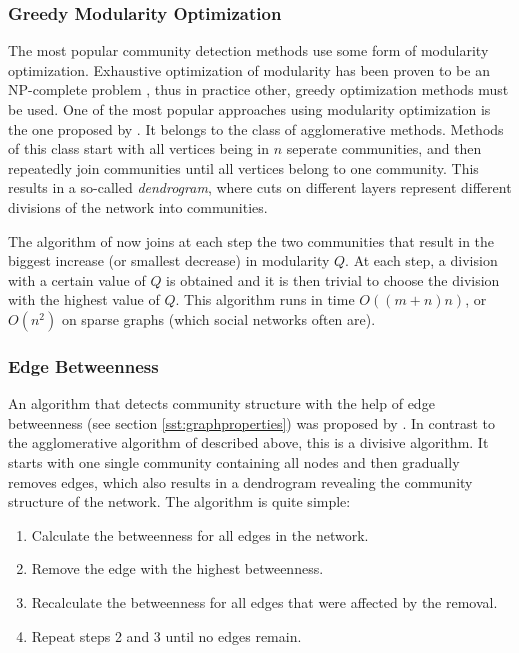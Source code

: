 \subsubsection{Greedy Modularity Optimization}
\label{ssst:modularityoptimization} The most popular community detection methods use some form of modularity optimization. Exhaustive optimization of modularity has been proven to be an NP-complete problem \cite{Brandes_2006}, thus in practice other, greedy optimization methods must be used. One of the most popular approaches using modularity optimization is the one proposed by \cite{Clauset_2004}. It belongs to the class of agglomerative methods. Methods of this class start with all vertices being in $n$ seperate communities, and then repeatedly join communities until all vertices belong to one community. This results in a so-called \textit{dendrogram}, where cuts on different layers represent different divisions of the network into communities.

The algorithm of \cite{Clauset_2004} now joins at each step the two communities that result in the biggest increase (or smallest decrease) in modularity $Q$. At each step, a division with a certain value of $Q$ is obtained and it is then trivial to choose the division with the highest value of $Q$. This algorithm runs in time $O((m+n)n)$, or $O(n^2)$ on sparse graphs (which social networks often are).

\subsubsection{Edge Betweenness}
\label{ssst:edgebetweenness} An algorithm that detects community structure with the help of edge betweenness (see section \ref{sst:graphproperties}) was proposed by \cite{Girvan_2002}. In contrast to the agglomerative algorithm of \cite{Clauset_2004} described above, this is a divisive algorithm. It starts with one single community containing all nodes and then gradually removes edges, which also results in a dendrogram revealing the community structure of the network. The algorithm is quite simple:

\begin{enumerate}
\item Calculate the betweenness for all edges in the network.
\item Remove the edge with the highest betweenness.
\item Recalculate the betweenness for all edges that were affected by the removal.
\item Repeat steps 2 and 3 until no edges remain.
\end{enumerate}

